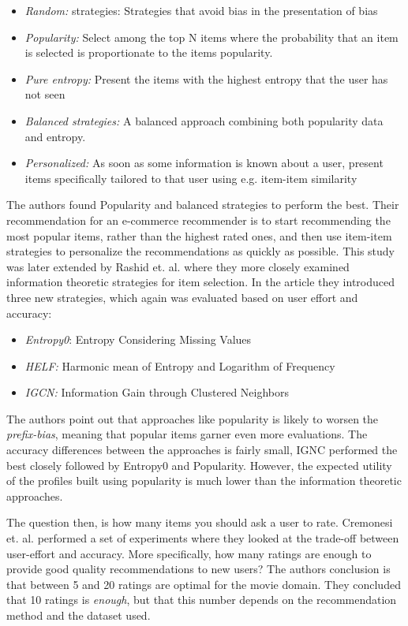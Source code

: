 \begin{itemize}
\item \emph{Random:} strategies: Strategies that avoid bias in the presentation
of bias
\item \emph{Popularity:} Select among the top N items where the probability
that an item is selected is proportionate to the items popularity.
\item \emph{Pure entropy:} Present the items with the highest entropy that the
user has not seen
\item \emph{Balanced strategies:} A balanced approach combining both popularity
data and entropy.
\item \emph{Personalized:} As soon as some information is known about a user,
present items specifically tailored to that user using e.g. item-item
similarity
\end{itemize}

The authors found Popularity and balanced strategies to perform the best. Their
recommendation for an e-commerce recommender is to start recommending the most
popular items, rather than the highest rated ones, and then use item-item
strategies to personalize the recommendations as quickly as possible. This
study was later extended by Rashid et. al. \cite{Rashid2008} where they more
closely examined information theoretic strategies for item selection. In the
article they introduced three new strategies, which again was evaluated based
on user effort and accuracy:

\begin{itemize}
\item \emph{Entropy0}: Entropy Considering Missing Values
\item \emph{HELF:} Harmonic mean of Entropy and Logarithm of Frequency
\item \emph{IGCN:} Information Gain through Clustered Neighbors
\end{itemize}

The authors point out that approaches like popularity is likely to worsen the
\emph{prefix-bias}, meaning that popular items garner even more evaluations.
The accuracy differences between the approaches is fairly small, IGNC performed
the best closely followed by Entropy0 and Popularity. However, the expected
utility of the profiles built using popularity is much lower than the
information theoretic approaches.\linebreak[4]

The question then, is how many items you should ask a user to rate. Cremonesi
et. al. \cite{Cremonesi2012} performed a set of experiments where they looked
at the trade-off between user-effort and accuracy. More specifically, how many
ratings are enough to provide good quality recommendations to new users? The
authors conclusion is that between 5 and 20 ratings are optimal for the movie
domain. They concluded that 10 ratings is \emph{enough}, but that this number
depends on the recommendation method and the dataset used.

